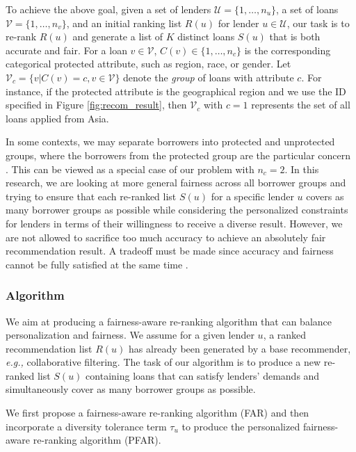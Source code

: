 To achieve the above goal, given a set of lenders $\mathcal U=\{1,\ldots,n_u\}$, a set of loans $\mathcal V=\{1,\ldots,n_v\}$, and an initial ranking list $R(u)$ for lender $u\in \mathcal U$, our task is to re-rank $R(u)$ and generate a list of $K$ distinct loans $S(u)$ that is both accurate and fair. For a loan $v\in\mathcal V$, $C(v)\in\{1,\ldots,n_c\}$ is the corresponding categorical protected attribute, such as region, race, or gender. Let $\mathcal V_c=\{v|C(v)=c, v\in \mathcal V\}$ denote the \emph{group} of loans with attribute $c$. For instance, if the protected attribute is the geographical region and we use the ID specified in Figure \ref{fig:recom_result}, then $\mathcal V_c$ with $c=1$ represents the set of all loans applied from Asia.


In some contexts, we may separate borrowers into protected and unprotected groups, where the borrowers from the protected group are the particular concern \cite{zliobaite2015survey}. This can be viewed as a special case of our problem with $n_c=2$. In this research, we are looking at more general fairness across all borrower groups and trying to ensure that each re-ranked list $S(u)$ for a specific lender $u$ covers as many borrower groups as possible while considering the personalized constraints for lenders in terms of their willingness to receive a diverse result.
However, we are not allowed to sacrifice too much accuracy to achieve an absolutely fair recommendation result. A tradeoff must be made since accuracy and fairness cannot be fully satisfied at the same time \cite{burke_robin_multisided_nodate}.


\subsubsection{\textbf{Algorithm}}
\hfill

We aim at producing a fairness-aware re-ranking algorithm that can balance personalization and fairness. We assume for a given lender $u$, a ranked recommendation list $R(u)$ has already been generated by a base recommender, \emph{e.g.,} collaborative filtering. The task of our algorithm is to produce a new re-ranked list $S(u)$ containing loans that can satisfy lenders' demands and simultaneously cover as many borrower groups as possible.

We first propose a fairness-aware re-ranking algorithm (FAR) and then incorporate a diversity tolerance term $\tau_u$ to produce the personalized fairness-aware re-ranking algorithm (PFAR).


